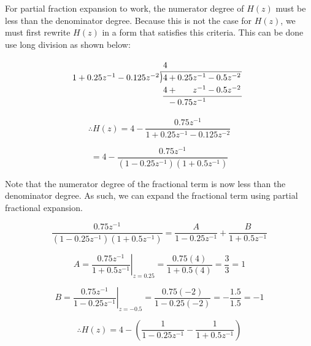 \documentclass[fleqn]{article}
\newcommand{\longdiv}{\smash{\mkern-0.43mu\vstretch{1.31}{\hstretch{.7}{)}}\mkern-5.2mu\vstretch{1.31}{\hstretch{.7}{)}}}}
\begin{document}
\begin{enumerate}[nolistsep]
\begin{enumerate}[nolistsep]
				 	For partial fraction expansion to work, the numerator degree of $H(z)$ must be less than the denominator degree. Because this is not the case for $H(z)$, we must first rewrite $H(z)$ in a form that satisfies this criteria. This can be done use long division as shown below:
						
					\[
					\arraycolsep=1pt
					\renewcommand\arraystretch{1.2}
					\begin{array}{*1r @{\hskip\arraycolsep}c@{\hskip\arraycolsep} *{11}r}
        				& & 4 & & & & & \\
					\cline{2-7}
					1 + 0.25z^{-1} - 0.125z^{-2} & \longdiv & 4 & + & 0.25z^{-1} & - & 0.5z^{-2}\\
        				& & 4 & + & z^{-1} & - & 0.5z^{-2} & & & \\
					\cline{3-7}
        				& & & - & 0.75z^{-1} & & & &
					\end{array}
					\]
					
					\begin{equation*}
						\therefore H(z) = 4 - \frac{0.75z^{-1}}{1 + 0.25z^{-1} - 0.125z^{-2}}
					\end{equation*}
					
					\begin{equation*}
						= 4 - \frac{0.75z^{-1}}{(1 - 0.25z^{-1})(1 + 0.5z^{-1})}
					\end{equation*}
					
					\pagebreak
					Note that the numerator degree of the fractional term is now less than the denominator degree. As such, we can expand the fractional term using partial fractional expansion.
					
					\begin{equation*}
						\frac{0.75z^{-1}}{(1 - 0.25z^{-1})(1 + 0.5z^{-1})} = \frac{A}{1 - 0.25z^{-1}} + \frac{B}{1 + 0.5z^{-1}}
					\end{equation*}
					
					\begin{equation*}
				 		A = \left.\frac{0.75z^{-1}}{1 + 0.5z^{-1}}\right\vert_{z = 0.25} = \frac{0.75(4)}{1 + 0.5(4)} = \frac{3}{3} = 1
				 	\end{equation*}
				 	
				 	\begin{equation*}
				 		B = \left.\frac{0.75z^{-1}}{1 - 0.25z^{-1}}\right\vert_{z = -0.5} = \frac{0.75(-2)}{1 - 0.25(-2)} = -\frac{1.5}{1.5} = -1
				 	\end{equation*}
					
					\begin{equation*}
						\therefore H(z) = 4 - \left(\frac{1}{1-0.25z^{-1}} - \frac{1}{1+0.5z^{-1}}\right)
					\end{equation*}
					

\end{enumerate}
\end{enumerate}
\end{document}
